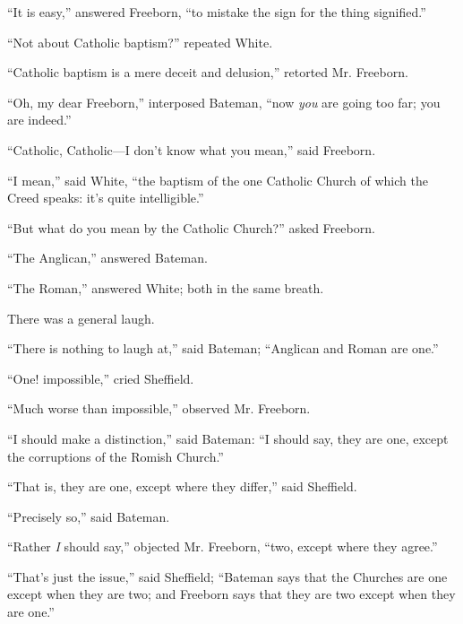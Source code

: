 ``It is easy,'' answered Freeborn, ``to mistake the
sign for the thing signified.''

``Not about Catholic baptism?'' repeated White.

``Catholic baptism is a mere deceit and delusion,''
retorted Mr. Freeborn.

``Oh, my dear Freeborn,'' interposed Bateman, ``now \emph{you}
are going too far; you are indeed.''

``Catholic, Catholic—I don't know what you mean,'' said
Freeborn.

``I mean,'' said White, ``the baptism of the one
Catholic Church of which the Creed speaks: it's quite
intelligible.''

``But what do you mean by the Catholic Church?'' asked
Freeborn.

``The Anglican,'' answered Bateman.

``The Roman,'' answered White; both in the same breath.

There was a general laugh.

``There is nothing to laugh at,'' said Bateman;
``Anglican and Roman are one.''

``One! impossible,'' cried Sheffield.

``Much worse than impossible,'' observed Mr. Freeborn.

``I should make a distinction,'' said Bateman: ``I
should say, they are one, except the corruptions of the Romish
Church.''

``That is, they are one, except where they differ,'' said
Sheffield.

``Precisely so,'' said Bateman.

``Rather \emph{I} should say,'' objected Mr. Freeborn,
``two, except where they agree.''

``That's just the issue,'' said Sheffield; ``Bateman
says that the Churches are one except when they are two; and Freeborn
says that they are two except when they are one.''

